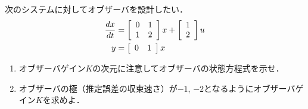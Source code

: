 \item
次のシステムに対してオブザーバを設計したい．
\begin{align}
	\frac{dx}{dt}
	&=	\bmatrix{cc}
			0 & 1 \\
			1 & 2
		\ematrix
		x
		+
		\bmatrix{c}
			1 \\
			2
		\ematrix
		u
\nonumber \\
	y 
	&=	\bmatrix{cc}
			0 & 1 
		\ematrix
		x
\nonumber 
\end{align}

\begin{enumerate}

\item 
オブザーバゲイン$K$の次元に注意してオブザーバの状態方程式を示せ．
\vspace{6cm}

\item
オブザーバの極（推定誤差の収束速さ）が$-1$, $-2$となるようにオブザーバゲイン$K$を求めよ．
\vspace{12cm}

\end{enumerate}
